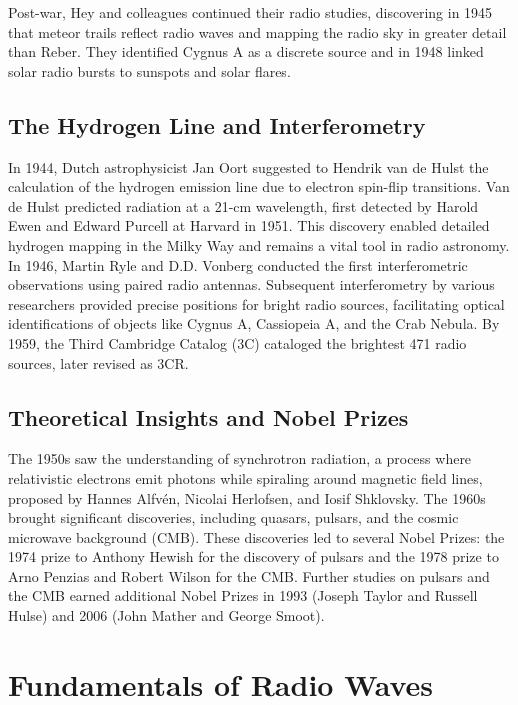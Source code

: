 Post-war, Hey and colleagues continued their radio studies, discovering in 1945 that meteor trails reflect radio waves and mapping the radio sky in greater detail than Reber. They identified Cygnus A as a discrete source and in 1948 linked solar radio bursts to sunspots and solar flares.

\subsection{The Hydrogen Line and Interferometry}

In 1944, Dutch astrophysicist Jan Oort suggested to Hendrik van de Hulst the calculation of the hydrogen emission line due to electron spin-flip transitions. Van de Hulst predicted radiation at a 21-cm wavelength, first detected by Harold Ewen and Edward Purcell at Harvard in 1951. This discovery enabled detailed hydrogen mapping in the Milky Way and remains a vital tool in radio astronomy. \\

In 1946, Martin Ryle and D.D. Vonberg conducted the first interferometric observations using paired radio antennas. Subsequent interferometry by various researchers provided precise positions for bright radio sources, facilitating optical identifications of objects like Cygnus A, Cassiopeia A, and the Crab Nebula. By 1959, the Third Cambridge Catalog (3C) cataloged the brightest 471 radio sources, later revised as 3CR.

\subsection{Theoretical Insights and Nobel Prizes}

The 1950s saw the understanding of synchrotron radiation, a process where relativistic electrons emit photons while spiraling around magnetic field lines, proposed by Hannes Alfvén, Nicolai Herlofsen, and Iosif Shklovsky. The 1960s brought significant discoveries, including quasars, pulsars, and the cosmic microwave background (CMB). These discoveries led to several Nobel Prizes: the 1974 prize to Anthony Hewish for the discovery of pulsars and the 1978 prize to Arno Penzias and Robert Wilson for the CMB. Further studies on pulsars and the CMB earned additional Nobel Prizes in 1993 (Joseph Taylor and Russell Hulse) and 2006 (John Mather and George Smoot).

\clearpage

\section{Fundamentals of Radio Waves}

